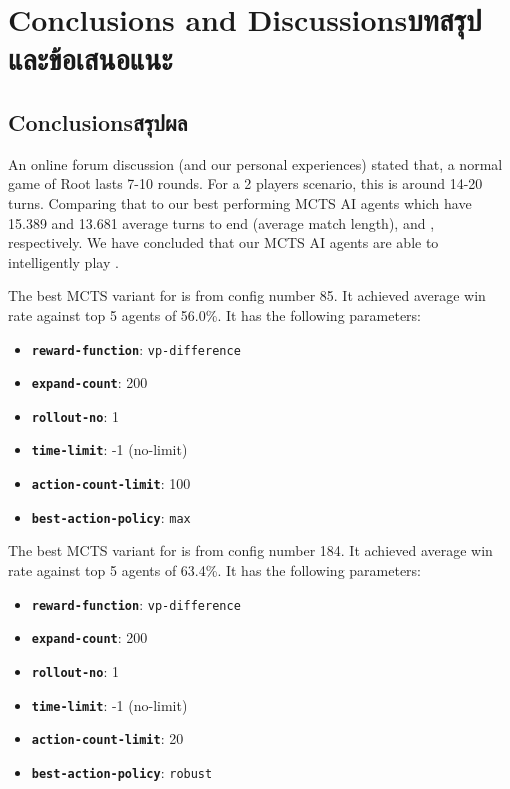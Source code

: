 \chapter{\ifenglish Conclusions and Discussions\else บทสรุปและข้อเสนอแนะ\fi}

\section{\ifenglish Conclusions\else สรุปผล\fi}

An online forum discussion (and our personal experiences) stated that, a normal game of Root lasts 7-10 rounds. For a 2 players scenario, this is around 14-20 turns. Comparing that to our best performing MCTS AI agents which have 15.389 and 13.681 average turns to end (average match length), \Marquise{} and \Eyrie{}, respectively. We have concluded that our MCTS AI agents are able to intelligently play \RootB{}.

The best MCTS variant for \Marquise{} is from config number 85. It achieved average win rate against top 5 \Eyrie{} agents of 56.0\%. It has the following parameters:
\begin{itemize}
    \item \textbf{\texttt{reward-function}}: \texttt{vp-difference}
    \item \textbf{\texttt{expand-count}}: 200
    \item \textbf{\texttt{rollout-no}}: 1
    \item \textbf{\texttt{time-limit}}: -1 (no-limit)
    \item \textbf{\texttt{action-count-limit}}: 100
    \item \textbf{\texttt{best-action-policy}}: \texttt{max}
\end{itemize}
The best MCTS variant for \Eyrie{} is from config number 184. It achieved average win rate against top 5 \Marquise{} agents of 63.4\%. It has the following parameters:
\begin{itemize}
    \item \textbf{\texttt{reward-function}}: \texttt{vp-difference}
    \item \textbf{\texttt{expand-count}}: 200
    \item \textbf{\texttt{rollout-no}}: 1
    \item \textbf{\texttt{time-limit}}: -1 (no-limit)
    \item \textbf{\texttt{action-count-limit}}: 20
    \item \textbf{\texttt{best-action-policy}}: \texttt{robust}
\end{itemize}

